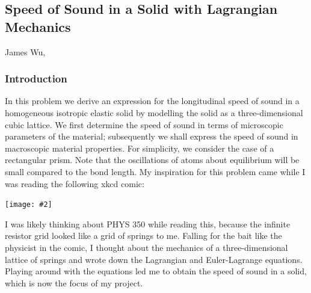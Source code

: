 \documentclass[letterpaper,12pt]{article}
\newcommand*{\qimg}[2]{\\ \begin{center}\texttt{[image: \#2]}\end{center}}
\begin{document}
\begin{center}
    \subsection*{Speed of Sound in a Solid with Lagrangian Mechanics}
    James Wu, 
\end{center}

\begin{flushleft}

    \subsubsection*{Introduction}
    In this problem we derive an expression for the longitudinal speed of sound in a homogeneous isotropic elastic solid by modelling the solid as a three-dimensional cubic lattice. We first determine the speed of sound in terms of microscopic parameters of the material; subsequently we shall express the speed of sound in macroscopic material properties. For simplicity, we consider the case of a rectangular prism. Note that the oscillations of atoms about equilibrium will be small compared to the bond length.\newline\newline
    My inspiration for this problem came while I was reading the following xkcd comic:
    \qimg{0.6}{images/xkcd.jpg}
    I was likely thinking about PHYS 350 while reading this, because the infinite resistor grid looked like a grid of springs to me. Falling for the bait like the physicist in the comic, I thought about the mechanics of a three-dimensional lattice of springs and wrote down the Lagrangian and Euler-Lagrange equations. Playing around with the equations led me to obtain the speed of sound in a solid, which is now the focus of my project.


\end{flushleft}
\end{document}
